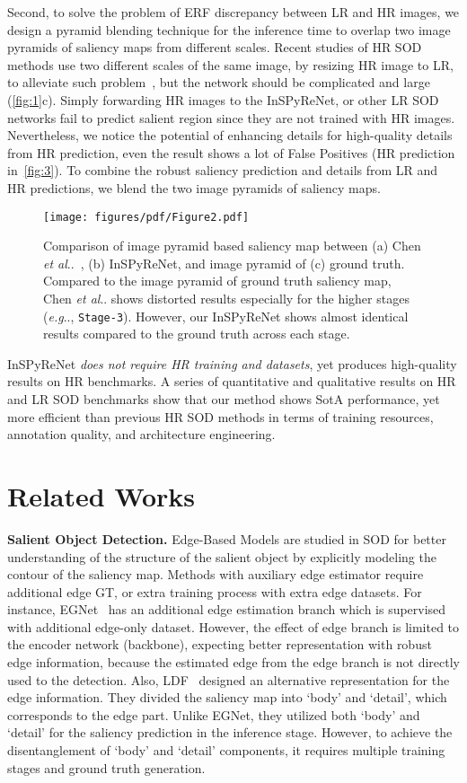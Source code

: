 \documentclass{llncs}
\makeatletter
\DeclareRobustCommand\onedot{\futurelet\@let@token\@onedot}
\def\@onedot{\ifx\@let@token.\else.\null\fi\xspace}
\def\eg{\emph{e.g}\onedot} \def\Eg{\emph{E.g}\onedot}
\def\etal{\emph{et al}\onedot}
\makeatother
\begin{document}
    Second, to solve the problem of ERF discrepancy between LR and HR images, we design a pyramid blending technique for the inference time to overlap two image pyramids of saliency maps from different scales.
    Recent studies of HR SOD methods use two different scales of the same image, by resizing HR image to LR, to alleviate such problem~\cite{zhang2021looking, xie2022pyramid}, but the network should be complicated and large (\cref{fig:1}c).
    Simply forwarding HR images to the InSPyReNet, or other LR SOD networks fail to predict salient region since they are not trained with HR images.
    Nevertheless, we notice the potential of enhancing details for high-quality details from HR prediction, even the result shows a lot of False Positives (HR prediction in~\cref{fig:3}).
    To combine the robust saliency prediction and details from LR and HR predictions, we blend the two image pyramids of saliency maps.
    \begin{figure}
    \centering
    \texttt{[image: figures/pdf/Figure2.pdf]} 
    \caption{Comparison of image pyramid based saliency map between (a) Chen \etal~\cite{chen2018reverse}, (b) InSPyReNet, and image pyramid of (c) ground truth.
    Compared to the image pyramid of ground truth saliency map, Chen \etal shows distorted results especially for the higher stages (\eg, \texttt{Stage-3}).
    However, our InSPyReNet shows almost identical results compared to the ground truth across each stage.}
    \label{fig:2}
\end{figure} 
    InSPyReNet \textit{does not require HR training and datasets}, yet produces high-quality results on HR benchmarks.
    A series of quantitative and qualitative results on HR and LR SOD benchmarks show that our method shows SotA performance, 
    yet more efficient than previous HR SOD methods in terms of training resources, annotation quality, and architecture engineering. 
\section{Related Works}
\label{sec:rel}

\noindent
\textbf{Salient Object Detection.} 
Edge-Based Models are studied in SOD for better understanding of the structure of the salient object by explicitly modeling the contour of the saliency map.
Methods with auxiliary edge estimator require additional edge GT, or extra training process with extra edge datasets. 
For instance, EGNet~\cite{zhao2019egnet} has an additional edge estimation branch which is supervised with additional edge-only dataset.
However, the effect of edge branch is limited to the encoder network (backbone), expecting better representation with robust edge information, 
because the estimated edge from the edge branch is not directly used to the detection. 
Also, LDF~\cite{wei2020label} designed an alternative representation for the edge information. They divided the saliency map into `body' and `detail', which corresponds to the edge part. 
Unlike EGNet, they utilized both `body' and `detail' for the saliency prediction in the inference stage. 
However, to achieve the disentanglement of `body' and `detail' components, it requires multiple training stages and ground truth generation.
\end{document}
